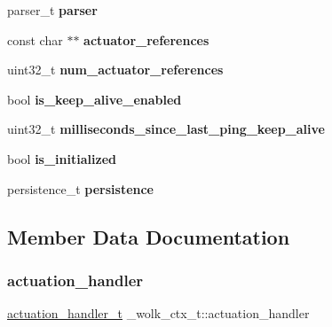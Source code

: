 \begin{DoxyCompactItemize}
\item 
\mbox{\label{struct__wolk__ctx__t_a75482b6b5f654f444aecd3ce133bcc8a}} 
parser\+\_\+t {\bfseries parser}
\item 
\mbox{\label{struct__wolk__ctx__t_a87d5e3b33fed53ef02c61111860fe929}} 
const char $\ast$$\ast$ {\bfseries actuator\+\_\+references}
\item 
\mbox{\label{struct__wolk__ctx__t_a3a96676f3cede3bd6f6e31d9cee30443}} 
uint32\+\_\+t {\bfseries num\+\_\+actuator\+\_\+references}
\item 
\mbox{\label{struct__wolk__ctx__t_a020de31835a1a0105cf149f2c66c4a1d}} 
bool {\bfseries is\+\_\+keep\+\_\+alive\+\_\+enabled}
\item 
\mbox{\label{struct__wolk__ctx__t_a1aa9fb2f10f0a9f2d7ca66734a28cd42}} 
uint32\+\_\+t {\bfseries milliseconds\+\_\+since\+\_\+last\+\_\+ping\+\_\+keep\+\_\+alive}
\item 
\mbox{\label{struct__wolk__ctx__t_a65aec58259024398da781689ad05799a}} 
bool {\bfseries is\+\_\+initialized}
\item 
\mbox{\label{struct__wolk__ctx__t_acedc150706ec304c5045f9c77b065ccd}} 
persistence\+\_\+t {\bfseries persistence}
\end{DoxyCompactItemize}


\subsection{Member Data Documentation}
\mbox{\label{struct__wolk__ctx__t_ac55ed80718abb1dca3027edda713ca57}} 
\subsubsection{\texorpdfstring{actuation\+\_\+handler}{actuation\_handler}}
{\footnotesize\ttfamily \hyperlink{WolkConn_8h_acde87869e807b1774680f3f2b5b04e2f}{actuation\+\_\+handler\+\_\+t} \+\_\+wolk\+\_\+ctx\+\_\+t\+::actuation\+\_\+handler}

